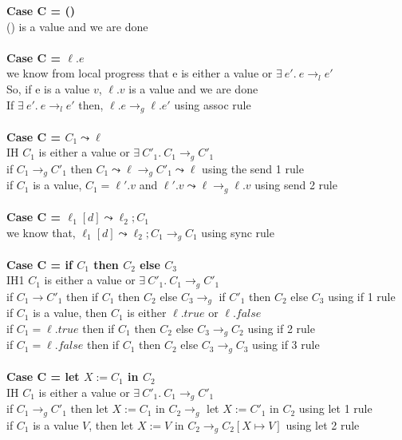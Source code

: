 \documentclass{article}
\begin{document}
\textbf{Case C = ()} \\
() is a value and we are done \\ \\
\textbf{Case C = $\ell.e$} \\
we know from local progress that e is either a value or $ \exists \ e'.\ e \to_l e'$  \\
So, if e is a value $v$, $\ell.v$ is a value and we are done \\
If $ \exists \ e'.\ e \to_l e'$ then, $ \ell. e \to_g \ell.e'$ using assoc rule
\\ \\
\textbf{Case C = $C_1 \leadsto \ell$} \\
IH $C_1$ is either a value or $  \exists \ C'_1.\ C_1 \to_g C'_1 $ \\
if $C_1 \to_g C'_1$ then $C_1 \leadsto \ell \to_g C'_1 \leadsto \ell$ using the send 1 rule \\
if $C_1$ is a value, $C_1 = \ell'.v$ and $\ell'.v \leadsto \ell \to_g \ell.v$ using send 2 rule 
\\
\\
\textbf{Case C = $\ell_1[d] \leadsto \ell_2; C_1$} \\ 
 we know that, $\ell_1[d] \leadsto \ell_2; C_1 \to_g C_1$ using sync rule \\
\\
\textbf{Case C = if $C_1$ then $C_2$ else $C_3$} \\
IH1 $C_1$ is either a value or $  \exists \ C'_1.\ C_1 \to_g C'_1 $ \\
if $C_1 \to C'_1$ then if $C_1$ then $C_2$ else $C_3 \to_g $ if $C'_1$ then $C_2$ else $C_3$ using if 1 rule\\
if $C_1$ is a value, then $C_1$ is either $\ell.true$ or $\ell.false$ \\
if $C_1 = \ell.true$ then if $C_1$ then $C_2$ else $C_3 \to_g C_2$ using if 2 rule\\
if $C_1 = \ell.false$ then if $C_1$ then $C_2$ else $C_3 \to_g C_3$ using if 3 rule\\
\\
\textbf{Case C = let $X := C_1$ in $C_2$} \\
IH $C_1$ is either a value or $  \exists \ C'_1.\ C_1 \to_g C'_1 $ \\
if $C_1 \to_g C'_1$ then let $X := C_1$ in $C_2 \to_g $ let $X := C'_1$ in $C_2$ using let 1 rule\\
if $C_1$ is a value $V$, then let $X := V$ in $C_2 \to_g C_2[X \mapsto V]$ using let 2 rule
\end{document}
